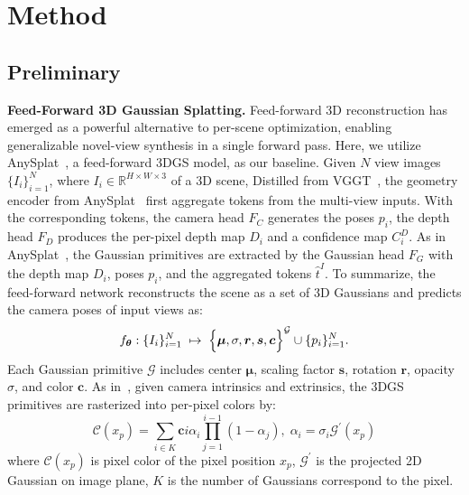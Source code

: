 
\section{Method}
\subsection{Preliminary}

\noindent\textbf{Feed-Forward 3D Gaussian Splatting.}
Feed-forward 3D reconstruction has emerged as a powerful alternative to per-scene optimization, enabling generalizable novel-view synthesis in a single forward pass. Here, we utilize AnySplat~\cite{jiang2025anysplat}, a feed-forward 3DGS model, as our baseline. Given $N$ view images $\{I_i\}_{i=1}^N$, where $I_i \in \mathbb{R}^{H\times W\times 3}$ of a 3D scene, Distilled from VGGT~\cite{wang2025vggt}, the geometry encoder from AnySplat~\cite{jiang2025anysplat} first aggregate tokens from the multi-view inputs. With the corresponding tokens, the camera head $F_C$ generates the poses $p_i$, the depth head $F_D$ produces the per-pixel depth map $D_i$ and a confidence map $C^D_i$. As in AnySplat~\cite{jiang2025anysplat}, the Gaussian primitives are extracted by the Gaussian head $F_G$ with the depth map $D_i$, poses $p_i$, and the aggregated tokens $\hat{t}^I$. To summarize, the feed-forward network reconstructs the scene as a set of 3D Gaussians and predicts the camera poses of input views as:
\begin{equation}
    f_{\boldsymbol{\theta}}:\{I_i\}_{i=1}^N
    \;\mapsto\;
    \Bigl\{
      \boldsymbol{\mu}, \sigma, \boldsymbol{r}, \boldsymbol{s}, \boldsymbol{c}
    \Bigr\}^\mathcal{G}
    \cup
    \{p_i\}_{i=1}^N.
    \label{eq:ffgs}
\end{equation}   Each Gaussian primitive $\mathcal{G}$ includes center $\boldsymbol{\mu}$, scaling factor $\boldsymbol{s}$, rotation $\boldsymbol{r}$, opacity $\sigma$, and color $\boldsymbol{c}$. As in~\cite{kerbl3Dgaussians}, given camera intrinsics and extrinsics, the 3DGS primitives are rasterized into per-pixel colors by:
\begin{equation}
\mathcal{C}(x_p) = \sum_{i\in K} \mathbf{c}i \alpha_i \prod_{j=1}^{i-1}(1 - \alpha_j), \; \alpha_i=\sigma_i\mathcal{G}^\prime(x_p)
\end{equation}
where $\mathcal{C}(x_p)$ is pixel color of the pixel position $x_p$,  $\mathcal{G}^\prime$ is the projected 2D Gaussian on image plane,  $K$ is the number of Gaussians correspond to the pixel.
\\
\\
